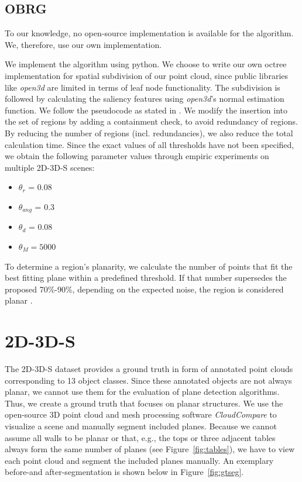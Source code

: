 \documentclass[main.tex]{subfiles}
\begin{document}
\subsection{OBRG}
\label{sec:impl-obrg}
To our knowledge, no open-source implementation is available for the algorithm.
We, therefore, use our own implementation.

We implement the algorithm using python. We choose to write our own octree implementation for spatial subdivision of our point cloud, since
public libraries like \textit{open3d} are limited in terms of leaf node functionality.
The subdivision is followed by calculating the saliency features using \textit{open3d}'s normal estimation function.
We follow the pseudocode as stated in \cite[Algorithm~1]{Vo_Truong-Hong_Laefer_Bertolotto_2015}. We modify the insertion into the set
of regions by adding a containment check, to avoid redundancy of regions. By reducing the number of regions (incl. redundancies), we also
reduce the total calculation time.
Since the exact values of all thresholds have not been specified, we obtain the following parameter values
through empiric experiments on multiple 2D-3D-S scenes:
\begin{itemize}
    \item $\theta_r$ = 0.08
    \item $\theta_{ang}$ = 0.3
    \item $\theta_d$ =  0.08
    \item $\theta_M = 5000$
\end{itemize}

To determine a region's planarity, we calculate the number of points that fit the best fitting plane within a predefined threshold.
If that number supersedes the proposed 70\%-90\%, depending on the expected noise, the region is considered planar \cite[Section~3.4]{Vo_Truong-Hong_Laefer_Bertolotto_2015}.




\section{2D-3D-S}
\label{sec:gtseg}
The 2D-3D-S dataset provides a ground truth in form of annotated point clouds corresponding to 13 object classes. Since these annotated objects are not
always planar, we cannot use them for the evaluation of plane detection algorithms. Thus, we create a ground truth that focuses on planar structures.
We use the open-source 3D point cloud and mesh processing software \textit{CloudCompare} to visualize a scene and manually segment included planes.
Because we cannot assume all walls to be planar or that, e.g., the tops or three adjacent tables always form the same number of planes (see Figure~\ref{fig:tables}), we
have to view each point cloud and segment the included planes manually. An exemplary before-and after-segmentation is shown below in Figure~\ref{fig:gtseg}.
\end{document}
